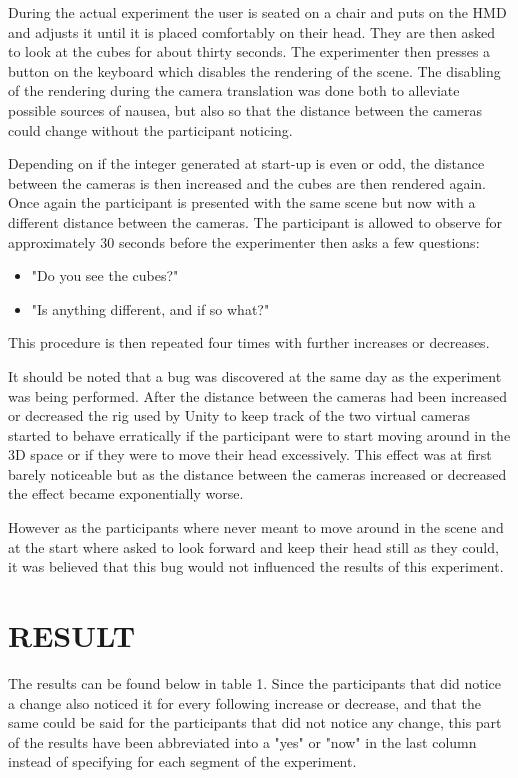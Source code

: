 \documentclass[tog]{acmsiggraph}
\begin{document}
During the actual experiment the user is seated on a chair and puts on the HMD and adjusts it until it is placed comfortably on their head. They are then asked to look at the cubes for about thirty seconds.
The experimenter then presses a button on the keyboard which disables the rendering of the scene. The disabling of the rendering during the camera translation was done both to alleviate possible sources of nausea, but also so that the distance between the cameras could change without the participant noticing. 

Depending on if the integer generated at start-up is even or odd, the distance between the cameras is then increased and the cubes are then rendered again. Once again the participant is presented with the same scene but now with a different distance between the cameras. The participant is allowed to observe for approximately 30 seconds before the experimenter then asks a few questions:
\begin{itemize}  
	
	\item "Do you see the cubes?"
	
	\item "Is anything different, and if so what?"
	 
	
\end{itemize}

This procedure is then repeated four times with further increases or decreases.

It should be noted that a bug was discovered at the same day as the experiment was being performed. After the distance between the cameras had been increased or decreased the rig used by Unity to keep track of the two virtual cameras started to behave erratically if the participant were to start moving around in the 3D space or if they were to move their head excessively. 
This effect was at first barely noticeable but as the distance between the cameras increased or decreased the effect became exponentially worse. 

However as the participants where never meant to move around in the scene and at the start where asked to look forward and keep their head still as they could, it was believed that this bug would not influenced the results of this experiment.

\section{RESULT}

The results can be found below in table 1. Since the participants that did notice a change also noticed it for every following increase or decrease, and that the same could be said for the participants that did not notice any change, this part of the results have been abbreviated into a "yes" or "now" in the last column instead of specifying for each segment of the experiment.    
\end{document}
